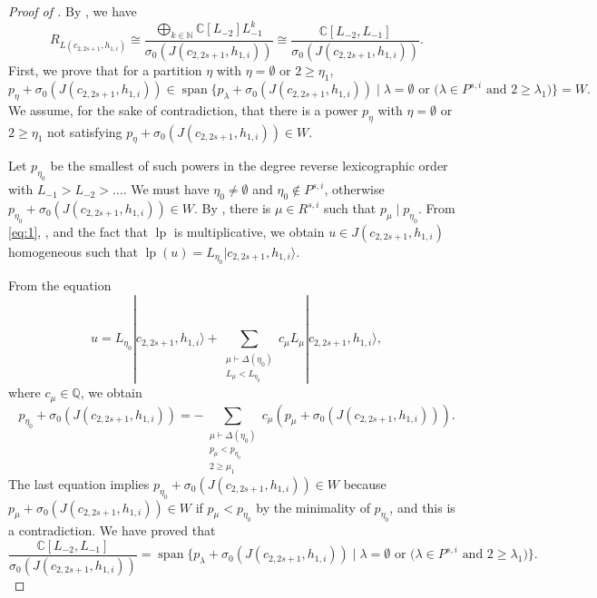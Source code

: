 \documentclass[a4paper, 12pt, reqno]{amsart}
\theoremstyle{remark}
\DeclareMathOperator{\vspan}{span}
\DeclareMathOperator{\lp}{lp}
\begin{document}
\begin{proof}[Proof of ]
  By , we have
  \begin{equation*}
    R_{L(c_{2, 2s + 1}, h_{1, i})} \cong \frac{\bigoplus_{k \in \mathbb{N}}\mathbb{C}[L_{-2}]L_{-1}^k}{\sigma_0(J(c_{2, 2s + 1}, h_{1, i}))} \cong \frac{\mathbb{C}[L_{-2}, L_{-1}]}{\sigma_0(J(c_{2, 2s + 1}, h_{1, i}))}.
  \end{equation*}
  First, we prove that for a partition $\eta$ with $\eta = \emptyset$ or $2 \ge \eta_1$,
  \begin{equation*}
    p_{\eta} + \sigma_0(J(c_{2, 2s + 1}, h_{1, i})) \in \vspan\{p_{\lambda} + \sigma_0(J(c_{2, 2s + 1}, h_{1, i})) \mid \text{$\lambda = \emptyset$ or ($\lambda \in P^{s, i}$ and $2 \ge \lambda_1$)}\} = W.
  \end{equation*}
  We assume, for the sake of contradiction, that there is a power $p_{\eta}$ with $\eta = \emptyset$ or $2 \ge \eta_1$ not satisfying $p_{\eta} + \sigma_0(J(c_{2, 2s + 1}, h_{1, i})) \in W$.

  Let $p_{\eta_0}$ be the smallest of such powers in the degree reverse lexicographic order with $L_{-1} > L_{-2} > \dots$.
  We must have $\eta_0 \neq \emptyset$ and $\eta_0 \notin P^{s, i}$, otherwise $p_{\eta_0} + \sigma_0(J(c_{2, 2s + 1}, h_{1, i})) \in W$.
  By , there is $\mu \in R^{s, i}$ such that $p_{\mu} \mid p_{\eta_0}$.
  From \eqref{eq:1}, ,  and the fact that $\lp$ is multiplicative, we obtain $u \in J(c_{2, 2s + 1}, h_{1, i})$ homogeneous such that $\lp(u) = L_{\eta_0}|c_{2, 2s + 1}, h_{1, i}\rangle$.

  From the equation
  \begin{equation*}
    u = L_{\eta_0}|c_{2, 2s + 1}, h_{1, i}\rangle + \sum_{\substack{\mu \vdash \Delta(\eta_0) \\ L_{\mu} < L_{\eta_0}}}c_{\mu}L_{\mu}|c_{2, 2s + 1}, h_{1, i}\rangle,
  \end{equation*}
  where $c_{\mu} \in \mathbb{Q}$, we obtain
  \begin{equation*}
    p_{\eta_0} + \sigma_0(J(c_{2, 2s + 1}, h_{1, i}))= -\sum_{\substack{\mu \vdash \Delta(\eta_0) \\ p_{\mu} < p_{\eta_0} \\ 2 \ge \mu_1}}c_{\mu}(p_{\mu} + \sigma_0(J(c_{2, 2s + 1}, h_{1, i}))).
  \end{equation*}
  The last equation implies $p_{\eta_0} + \sigma_0(J(c_{2, 2s + 1}, h_{1, i})) \in W$ because $p_{\mu} + \sigma_0(J(c_{2, 2s + 1}, h_{1, i})) \in W$ if $p_{\mu} < p_{\eta_0}$ by the minimality of $p_{\eta_0}$, and this is a contradiction.
  We have proved that
  \begin{equation}
    \label{eq:7}
    \frac{\mathbb{C}[L_{-2}, L_{-1}]}{\sigma_0(J(c_{2, 2s + 1}, h_{1, i}))} = \vspan\{p_{\lambda} + \sigma_0(J(c_{2, 2s + 1}, h_{1, i})) \mid \text{$\lambda = \emptyset$ or ($\lambda \in P^{s, i}$ and $2 \ge \lambda_1$)}\}.
  \end{equation}


\end{proof}
\end{document}
